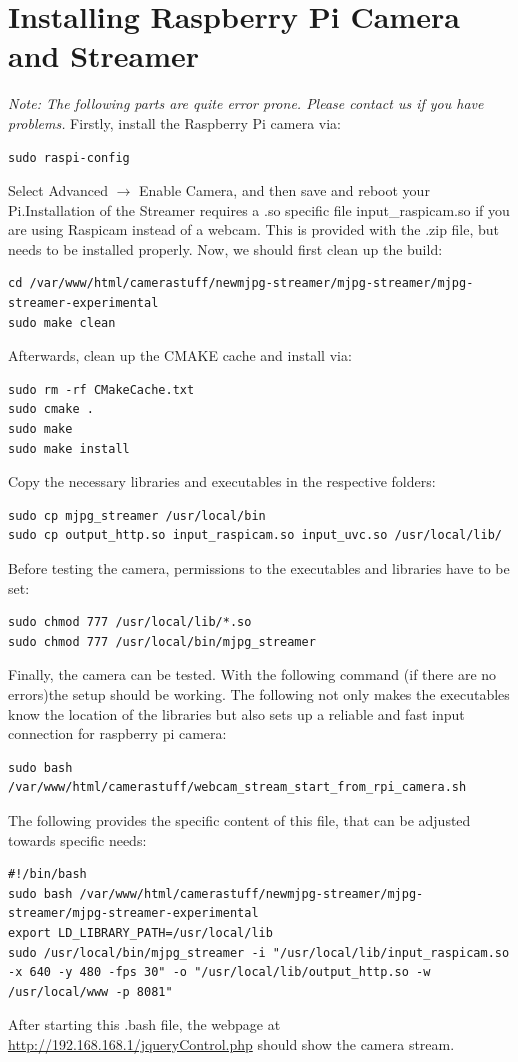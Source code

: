 \section{Installing Raspberry Pi Camera and Streamer}
\textit{Note: The following parts are quite error prone. Please contact us if you have problems.}
Firstly, install the Raspberry Pi camera via:
\begin{lstlisting}
sudo raspi-config
\end{lstlisting}
Select Advanced $\rightarrow$ Enable Camera, and then save and reboot your Pi.Installation of the Streamer requires a .so specific file input\_raspicam.so if you are using Raspicam instead of a webcam. This is provided with the .zip file, but needs to be installed properly. Now, we should first clean up the build:
\begin{lstlisting}
cd /var/www/html/camerastuff/newmjpg-streamer/mjpg-streamer/mjpg-streamer-experimental
sudo make clean
\end{lstlisting}
Afterwards, clean up the CMAKE cache and install via:
\begin{lstlisting}
sudo rm -rf CMakeCache.txt
sudo cmake .
sudo make
sudo make install
\end{lstlisting}
Copy the necessary libraries and executables in the respective folders:
\begin{lstlisting}
sudo cp mjpg_streamer /usr/local/bin
sudo cp output_http.so input_raspicam.so input_uvc.so /usr/local/lib/
\end{lstlisting}
Before testing the camera,  permissions to the executables and libraries have to be set:
\begin{lstlisting}
sudo chmod 777 /usr/local/lib/*.so
sudo chmod 777 /usr/local/bin/mjpg_streamer
\end{lstlisting}
Finally, the camera can be tested. With the following command (if there are no errors)the setup should be working. The following not only makes the executables know the location of the libraries but also sets up a reliable and fast input connection for raspberry pi camera:
\begin{lstlisting}
sudo bash /var/www/html/camerastuff/webcam_stream_start_from_rpi_camera.sh
\end{lstlisting}
The following provides the specific content of this file, that can be adjusted towards specific needs:
\begin{lstlisting}
#!/bin/bash
sudo bash /var/www/html/camerastuff/newmjpg-streamer/mjpg-streamer/mjpg-streamer-experimental 
export LD_LIBRARY_PATH=/usr/local/lib
sudo /usr/local/bin/mjpg_streamer -i "/usr/local/lib/input_raspicam.so -x 640 -y 480 -fps 30" -o "/usr/local/lib/output_http.so -w /usr/local/www -p 8081"
\end{lstlisting}
After starting this .bash file, the webpage at \url{http://192.168.168.1/jqueryControl.php} should show the camera stream.
\newpage
